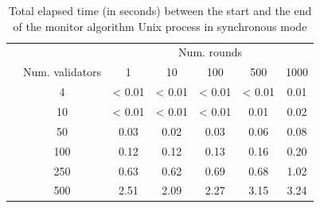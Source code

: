 \documentclass[a4paper,11pt,oneside]{report}
\begin{document}
\begin{table}[]
\centering
\begin{tabular}{l|c|c|c|c|c|c|}
\cline{2-7}
                  &   & \multicolumn{5}{c|}{Num. rounds} \\ \cline{2-7} 
\multirow{7}{*}{} & Num. validators & 1   & 10   & 100  & 500  & 1000  \\ \cline{2-7} 
                  & 4               & < 0.01  & < 0.01  & < 0.01 &  < 0.01 & 0.01      \\ \cline{2-7} 
                  & 10              & < 0.01    & < 0.01     &   < 0.01   & 0.01  & 0.02      \\ \cline{2-7} 
                  & 50              & 0.03    &  0.02    & 0.03     &  0.06    &  0.08     \\ \cline{2-7} 
                  & 100             & 0.12  & 0.12    & 0.13  & 0.16     & 0.20      \\ \cline{2-7} 
                  & 250             &  0.63   & 0.62     &  0.69    &  0.68    &  1.02     \\ \cline{2-7} 
                  & 500             & 2.51    & 2.09     &  2.27    &  3.15    & 3.24      \\ \cline{2-7} 
\end{tabular}
\caption{Total elapsed time (in seconds) between the start and the end of the monitor algorithm Unix process in synchronous mode}
\end{table}
\end{document}
